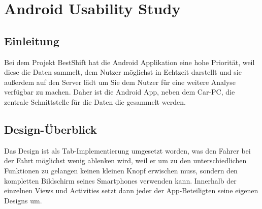 \chapter{Android Usability Study}
\section{Einleitung}
Bei dem Projekt BestShift hat die Android Applikation eine hohe Priorität, weil diese die Daten sammelt, dem Nutzer möglichst in Echtzeit darstellt und sie außerdem auf den Server lädt um Sie dem Nutzer für eine weitere Analyse verfügbar zu machen. 
Daher ist die Android App, neben dem Car-PC, die zentrale Schnittstelle für die Daten die gesammelt werden. 

\section{Design-Überblick}
Das Design ist als Tab-Implementierung umgesetzt worden, was den Fahrer bei der Fahrt möglichst wenig ablenken wird, weil er um zu den unterschiedlichen Funktionen zu gelangen keinen kleinen Knopf erwischen muss, sondern den kompletten Bildschirm seines Smartphones verwenden kann. Innerhalb der einzelnen Views und Activities setzt dann jeder der App-Beteiligten seine eigenen Designs um. 

